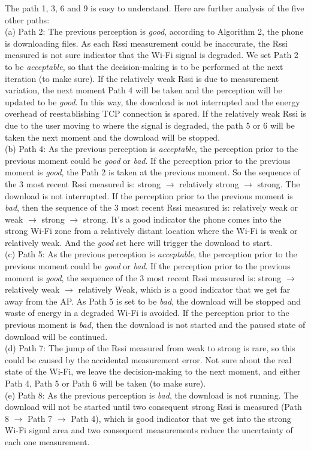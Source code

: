 \documentclass[journal]{IEEEtran}
\begin{document}
The path 1, 3, 6 and 9 is easy to understand. Here are further analysis of the 
five other paths:
\\
\indent
(a) Path 2: 
The previous perception is \textit{good}, according to Algorithm 2, the phone is downloading files. 
As each Rssi measurement could be inaccurate, the Rssi measured is not sure indicator that the Wi-Fi signal is degraded. 
We set Path 2 to be \textit{acceptable}, so that the decision-making is to be performed at the next iteration (to make sure). If the 
relatively weak Rssi is due to measurement variation, 
the next moment Path 4 will be taken and the perception will be updated to be \textit{good}.
In this way, the download is not interrupted and the energy overhead of reestablishing TCP connection is spared. If the relatively
weak Rssi is due to the user moving to where the signal is degraded, the path 5 or 6 will be taken the next moment and the download will 
be stopped. 
\\
\indent
(b) Path 4:
As the previous perception  is \textit{acceptable}, the perception prior to the previous moment could be \textit{good} or \textit{bad}. 
If the perception prior to the previous moment is \textit{good}, the Path 2 is taken at the previous moment. 
So the sequence of the 3 most recent Rssi measured is: strong $\to$  relatively strong 
$\to$ strong. The download is not interrupted. If the perception prior to the previous moment is \textit{bad}, then the sequence of the 3 most recent Rssi measured 
is: relatively weak or weak $\to$  strong $\to$  strong. It's a good indicator the phone comes into the strong Wi-Fi zone from
a relatively distant location where the Wi-Fi is weak or relatively weak. And the \textit{good} set here will trigger the download to start.
\\
\indent
(c) Path 5:
As the previous perception is \textit{acceptable}, 
the perception prior to the previous moment could be \textit{good} or \textit{bad}.
If the perception prior to the previous moment is \textit{good}, the sequence of the 3 most recent Rssi measured is: strong $\to$  relatively weak $\to$  relatively Weak, 
which is a good indicator that we get far away from the AP. As Path 5 is set to be \textit{bad}, the download will be stopped and waste of energy in a 
degraded Wi-Fi is avoided. If the perception prior to the previous moment is \textit{bad}, then the download is not started and the paused state of download will be continued.
\\
\indent
(d) Path 7:
The jump of the Rssi measured from weak to strong is rare, so this could be caused by the accidental measurement error. Not sure about the real state 
of the Wi-Fi, we leave the decision-making to the next moment, and either Path 4, Path 5 or Path 6 will be taken (to make sure). 
\\
\indent
(e) Path 8:
As the previous perception is \textit{bad}, the download is not running. The download will not be started until 
two consequent strong Rssi is measured (Path 8 $\to$ Path 7 $\to$ Path 4), which 
is good indicator that we get into the strong Wi-Fi signal area and two consequent measurements reduce the uncertainty of each one measurement. 
\end{document}
